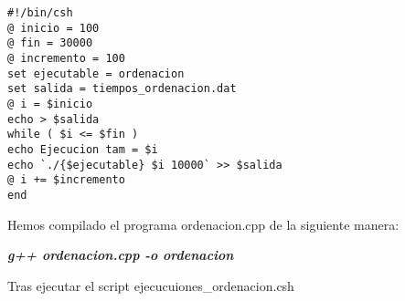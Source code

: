 \documentclass[a4paper,11pt]{article}
\begin{document}
\lstset{language=Bash, breaklines=true, basicstyle=\footnotesize}
\begin{lstlisting}[frame=single]
#!/bin/csh
@ inicio = 100
@ fin = 30000
@ incremento = 100
set ejecutable = ordenacion
set salida = tiempos_ordenacion.dat
@ i = $inicio
echo > $salida
while ( $i <= $fin )
echo Ejecucion tam = $i
echo `./{$ejecutable} $i 10000` >> $salida
@ i += $incremento
end
\end{lstlisting}
Hemos compilado el programa ordenacion.cpp de la siguiente manera:
\begin{center}
{\bf \it g++ ordenacion.cpp -o ordenacion}
\end{center}
Tras ejecutar el script ejecucuiones\_ordenacion.csh
\end{document}
